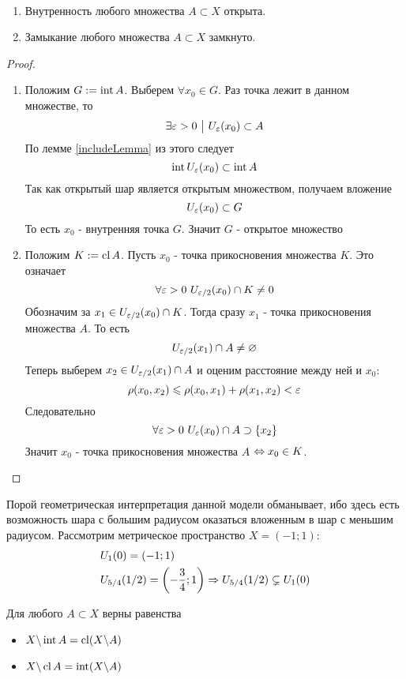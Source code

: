 \begin{theorem}~
	\begin{enumerate}
		\item Внутренность любого множества $A \subset X$ открыта.
		
		\item Замыкание любого множества $A \subset X$ замкнуто.
	\end{enumerate}
\end{theorem}

\begin{proof}~
	\begin{enumerate}
		\item Положим $G := \operatorname{int} A$. Выберем $\forall x_0 \in G$. Раз точка лежит в данном множестве, то
		\[
			\exists \varepsilon > 0 \ \big|\  U_\varepsilon(x_0) \subset A
		\]
		По лемме \ref{includeLemma} из этого следует
		\[
			\operatorname{int} U_\varepsilon(x_0) \subset \operatorname{int} A
		\]
		Так как открытый шар является открытым множеством, получаем вложение
		\[
			U_\varepsilon(x_0) \subset G
		\]
		То есть $x_0$ - внутренняя точка $G$. Значит $G$ - открытое множество
	
		\item Положим $K := \operatorname{cl} A$. Пусть $x_0$ - точка прикосновения множества $K$. Это означает
		\[
			\forall \varepsilon > 0\ U_{\varepsilon / 2}(x_0) \cap K \neq 0
		\]
		Обозначим за $x_1 \in U_{\varepsilon / 2}(x_0) \cap K$. Тогда сразу $x_1$ - точка прикосновения множества $A$. То есть
		\[
			U_{\varepsilon / 2}(x_1) \cap A \neq \varnothing
		\]
		Теперь выберем $x_2 \in U_{\varepsilon / 2}(x_1) \cap A$ и оценим расстояние между ней и $x_0$:
		\[
			\rho(x_0, x_2) \leqslant \rho(x_0, x_1) + \rho(x_1, x_2) < \varepsilon
		\]
		Следовательно
		\[
			\forall \varepsilon > 0\ U_{\varepsilon}(x_0) \cap A \supset \{x_2\}
		\]
		Значит $x_0$ - точка прикосновения множества $A$ $\Leftrightarrow x_0 \in K$.
	\end{enumerate}
\end{proof}

\begin{example}
	Порой геометрическая интерпретация данной модели обманывает, ибо здесь есть возможность шара с большим радиусом оказаться вложенным в шар с меньшим радиусом. Рассмотрим метрическое пространство $X = (-1; 1)$:
	\begin{align*}
		&{U_{1}(0) = (-1; 1)}
		\\
		&{U_{5/4}(1/2) = \left(-\frac{3}{4}; 1\right) \Rightarrow U_{5/4}(1/2) \subsetneq U_{1}(0)}
	\end{align*}
\end{example}

\begin{lemma}
	Для любого $A \subset X$ верны равенства
	\begin{itemize}
		\item $X \backslash \operatorname{int} A = \operatorname{cl}(X \backslash A)$
		
		\item $X \backslash \operatorname{cl} A = \operatorname{int}(X \backslash A)$
	\end{itemize}
\end{lemma}


